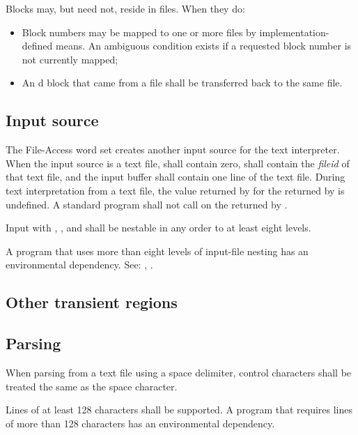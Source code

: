 Blocks may, but need not, reside in files.
When they do:
\begin{itemize}
\item Block numbers may be mapped to one or more files by
	implementation-defined means. An ambiguous condition exists
	if a requested block number is not currently mapped;
\item An d block that came from a file shall
	be transferred back to the same file.
\end{itemize}


\subsection{Input source} %
\label{file:source}

The File-Access word set creates another input source for the text
interpreter. When the input source is a text file, 
shall contain zero,  shall contain the \emph{fileid}
of that text file, and the input buffer shall contain one line of
the text file.  During text interpretation from a text file, the
value returned by  for the  returned
by  is undefined.  A standard program
shall not call  on the  returned
by .

Input with , , 
and  shall be nestable in any order to at least
eight levels.

A program that uses more than eight levels of input-file nesting has
an environmental dependency. See:
,
.

\subsection{Other transient regions} %
\label{file:buffers}

\subsection{Parsing} %
\label{file:parsing}

When parsing from a text file using a space delimiter, control
characters shall be treated the same as the space character.

Lines of at least 128 characters shall be supported. A program that
requires lines of more than 128 characters has an environmental
dependency.

